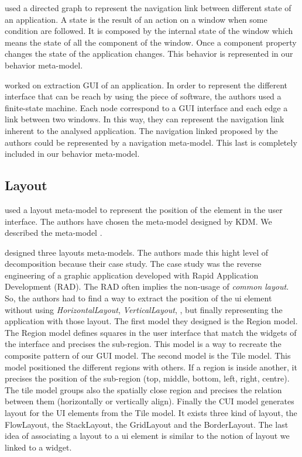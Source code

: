 \documentclass[conference]{IEEEtran}
\begin{document}
\citet{silva2010guisurfer} used a directed graph to represent the navigation link between different state of an application.
A state is the result of an action on a window when some condition are followed.
It is composed by the internal state of the window which means the state of all the component of the window.
Once a component property changes the state of the application changes.
This behavior is represented in our behavior meta-model.

\citet{aho2013industrial} worked on extraction GUI of an application.
In order to represent the different interface that can be reach
    by using the piece of software, 
    the authors used a finite-state machine.
Each node correspond to a GUI interface and each edge a link between two windows.
In this way, they can represent the navigation link inherent to the analysed application.
The navigation linked proposed by the authors could be represented
    by a navigation meta-model.
This last is completely included in our behavior meta-model.

\subsection{Layout}
\label{sec:layout}

\citet{gotti2016java} used a layout meta-model to represent
    the position of the element in the user interface.
The authors have chosen the meta-model designed by KDM.
We described the meta-model .

\citet{sanchez2014model} designed three layouts meta-models.
The authors made this hight level of decomposition because their case study.
The case study was the reverse engineering of a graphic application developed
    with Rapid Application Development (RAD).
The RAD often implies the non-usage of \textit{common layout}.
So, the authors had to find a way to extract the position of the ui element
    without using \textit{HorizontalLayout}, \textit{VerticalLayout}, \etc, but
    finally representing the application with those layout.
The first model they designed is the Region model.
The Region model defines squares in the user interface that match the widgets of the interface
    and precises the sub-region.
This model is a way to recreate the composite pattern of our GUI model.
The second model is the Tile model.
This model positioned the different regions with others.
If a region is inside another, it precises the position of the sub-region (top, middle, bottom, left, right, centre).
The tile model groups also the spatially close region and precises the relation between them (horizontally or vertically align).
Finally the CUI model generates layout for the UI elements from the Tile model.
It exists three kind of layout, the FlowLayout, the StackLayout, the GridLayout and the BorderLayout.
The last idea of associating a layout to a ui element is similar to the notion of layout we linked to a widget.
\end{document}
